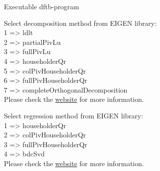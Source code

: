 \begin{description}
  \item[] Executable dftb-program 
  \item[] Select decomposition method from EIGEN library:\\
       1 => ldlt \\
       2 => partialPivLu \\
       3 => fullPivLu \\
       4 => householderQr \\
       5 => colPivHouseholderQr \\
       6 => fullPivHouseholderQr \\
       7 => completeOrthogonalDecomposition \\
                            Please check the
                            \href{http://eigen.tuxfamily.org/dox/group__TutorialLinearAlgebra.html}{website}
                            for more information. \\
  \item[] Select  regression method from EIGEN library:\\
       1 => householderQr \\
       2 => colPivHouseholderQr \\
       3 => fullPivHouseholderQr \\
       4 => bdcSvd \\
                            Please check the
                            \href{http://eigen.tuxfamily.org/dox/group__LeastSquares.html}{website}
                            for more information. \\


\end{description}
